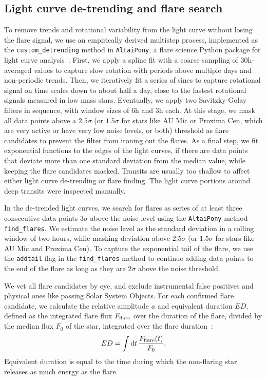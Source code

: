 \documentclass[twocolumn]{aastex631}
\begin{document}
\subsection{Light curve de-trending and flare search}
\label{sec:methods:flaresearch}
To remove trends and rotational variability from the light curve without losing the flare signal, we use an empirically derived multistep process, implemented as the \texttt{custom\_detrending} method in \texttt{AltaiPony}, a flare science Python package for light curve analysis~\citep{ilin2021altaipony}. First, we apply a spline fit with a coarse sampling of 30h-averaged values to capture slow rotation with periods above multiple days and non-periodic trends. Then, we iteratively fit a series of sines to capture rotational signal on time scales down to about half a day, close to the fastest rotational signals measured in low mass stars. Eventually, we apply two Savitzky-Golay~\citep{savitzky1964smoothing} filters in sequence, with window sizes of 6h and 3h each. At this stage, we mask all data points above a $2.5 \sigma$ (or $1.5 \sigma$ for stars like AU Mic or Proxima Cen, which are very active or have very low noise levels, or both) threshold as flare candidates to prevent the filter from ironing out the flares. As a final step, we fit exponential functions to the edges of the light curves, if there are data points that deviate more than one standard deviation from the median value, while keeping the flare candidates masked. Transits are usually too shallow to affect either light curve de-trending or flare finding. The light curve portions around deep transits were inspected manually.

In the de-trended light curves, we search for flares as series of at least three consecutive data points $3\sigma$ above the noise level using the \texttt{AltaiPony} method \texttt{find\_flares}. We estimate the noise level as the standard deviation in a rolling window of two hours, while masking deviation above $2.5\sigma$ (or $1.5\sigma$  for stars like AU Mic and Proxima Cen). To capture the exponential tail of the flare, we use the \texttt{addtail} flag in the \texttt{find\_flares} method to continue adding data points to the end of the flare as long as they are $2\sigma$ above the noise threshold.

We vet all flare candidates by eye, and exclude instrumental false positives and physical ones like passing Solar System Objects. For each confirmed flare candidate, we calculate the relative amplitude $a$ and equivalent duration $ED$, defined as the integrated flare flux $F_{\rm flare}$ over the duration of the flare, divided by the median flux $F_0$ of the star, integrated over the flare duration~\citep{gershberg1972results}:
\begin{equation}
\label{eq:ED}
ED=\displaystyle \int \mathrm dt\, \frac{F_{\rm flare}(t)}{F_0}.
\end{equation}
Equivalent duration is equal to the time during which the non-flaring star releases as much energy as the flare.
\end{document}
